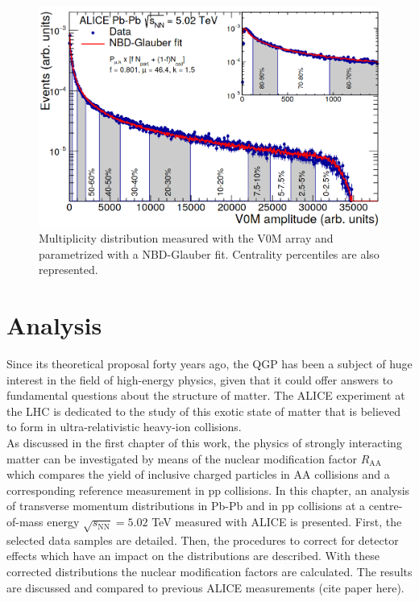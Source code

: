 \documentclass[12pt,a4paper]{report}
\begin{document}
\begin{figure}[tb!]
\centering
\includegraphics[width=12cm]{Plots/V0Amplitude.png}  
\caption{Multiplicity distribution measured with the V0M array and parametrized with a NBD-Glauber fit. Centrality percentiles are also represented.}
\label{V0Amplitude}
\end{figure}
\chapter{Analysis}
Since its theoretical proposal forty years ago, the QGP has been a subject of huge interest in the field of high-energy physics, given that it could offer answers to fundamental questions about the structure of matter. The ALICE experiment at the LHC is dedicated to the study of this exotic state of matter that is believed to form in ultra-relativistic heavy-ion collisions. \\
As discussed in the first chapter of this work, the physics of strongly interacting matter can be investigated by means of the nuclear modification factor $R_\text{AA}$ which compares the yield of inclusive charged particles in AA collisions and a corresponding reference measurement in pp collisions. In this chapter, an analysis of transverse momentum distributions in Pb-Pb and in pp collisions at a centre-of-mass energy $\sqrt{s_\text{NN}}= 5.02$ TeV measured with ALICE is presented. First, the selected data samples are detailed. Then, the procedures to correct for detector effects which have an impact on the \pt distributions are described. With these corrected \pt distributions the nuclear modification factors are calculated. The results are discussed and compared to previous ALICE measurements (cite paper here).
\end{document}
